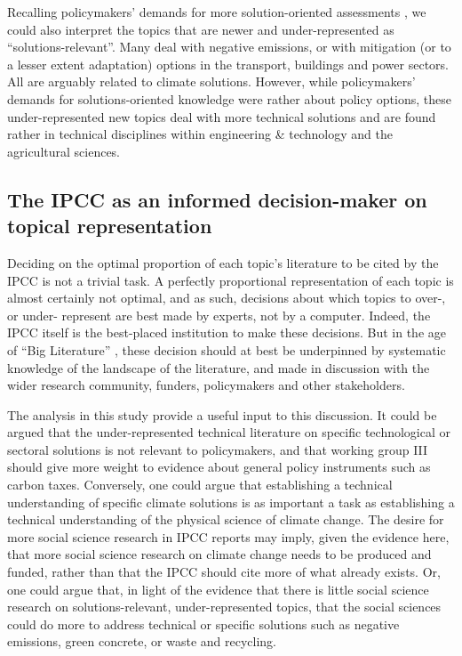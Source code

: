 \documentclass{article}
\begin{document}
\begin{linenumbers}
		
		Recalling policymakers' demands for more solution-oriented assessments \cite{Kowarsch2017}, we could also interpret the topics that are newer and under-represented as ``solutions-relevant''. Many deal with negative emissions, or with mitigation (or to a lesser extent adaptation) options in the transport, buildings and power sectors. All are arguably related to climate solutions. However, while policymakers' demands for solutions-oriented knowledge were rather about policy options, these under-represented new topics deal with more technical solutions and are found rather in technical disciplines within engineering \& technology and the agricultural sciences.
		
		\subsection*{The IPCC as an informed decision-maker on topical representation}
		
		Deciding on the optimal proportion of each topic's literature to be cited by the IPCC is not a trivial task. A perfectly proportional representation of each topic is almost certainly not optimal, and as such, decisions about which topics to over-, or under- represent are best made by experts, not by a computer. Indeed, the IPCC itself is the best-placed institution to make these decisions. But in the age of ``Big Literature'' \cite{Nunez-Mir2016}, these decision should at best be underpinned by systematic knowledge of the landscape of the literature, and made in discussion with the wider research community, funders, policymakers and other stakeholders.
		
		The analysis in this study provide a useful input to this discussion. It could be argued that the under-represented technical literature on specific technological or sectoral solutions is not relevant to policymakers, and that working group III should give more weight to evidence about general policy instruments such as carbon taxes. Conversely, one could argue that establishing a technical understanding of specific climate solutions is as important a task as establishing a technical understanding of the physical science of climate change. The desire for more social science research in IPCC reports may imply, given the evidence here, that more social science research on climate change needs to be produced and funded, rather than that the IPCC should cite more of what already exists. Or, one could argue that, in light of the evidence that there is little social science research on solutions-relevant, under-represented topics, that the social sciences could do more to address technical or specific solutions such as negative emissions, green concrete, or waste and recycling.
		

\end{linenumbers}
\end{document}
